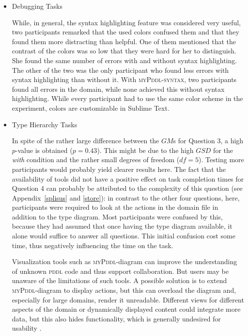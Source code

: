 \documentclass[runningheads]{llncs}
\newcommand{\mypddl}{\textsc{myPddl}\xspace}
\newcommand{\mypddlsyntax}{\textsc{myPddl-syntax}\xspace}
\newcommand{\pddl}{\textsc{pddl}\xspace}
\newcommand{\sublimetext}{Sublime Text\xspace}
\begin{document}
\begin{itemize}
\item Debugging Tasks

  While, in general, the syntax highlighting feature was considered
  very useful, two participants remarked that the used colors confused
  them and that they found them more distracting than helpful. One of
  them mentioned that the contrast of the colors was so low that they
  were hard for her to distinguish. She found the same number of
  errors with and without syntax highlighting. The other of the two
  was the only participant who found less errors with syntax
  highlighting than without it. With \mypddlsyntax, two participants
  found all errors in the domain, while none achieved this without
  syntax highlighting. While every participant had to use the same
  color scheme in the experiment, colors are customizable in
  \sublimetext.

\item Type Hierarchy Tasks

  In spite of the rather large difference between the $GM$s for
  Question 3, a high $p$-value is obtained ($p = 0.43$). This might be
  due to the high $GSD$ for the \emph{with} condition and the rather
  small degrees of freedom ($df = 5$). Testing more participants would
  probably yield clearer results here. The fact that the availability
  of tools did not have a positive effect on task completion times for
  Question 4 can probably be attributed to the complexity of this
  question (see Appendix~\ref{splisus} and \ref{store}): in contrast
  to the other four questions, here, participants were required to
  look at the actions in the domain file in addition to the type
  diagram. Most participants were confused by this, because they had
  assumed that once having the type diagram available, it alone would
  suffice to answer all questions. This initial confusion cost some
  time, thus negatively influencing the time on the task.

  Visualization tools such as \mypddl -diagram can improve the
  understanding of unknown \pddl code and thus support
  collaboration. But users may be unaware of the limitations of such
  tools. A possible solution is to extend \mypddl -diagram to display
  actions, but this can overload the diagram and, especially for large
  domains, render it unreadable. Different views for different aspects
  of the domain or dynamically displayed content could integrate more
  data, but this also hides functionality, which is generally
  undesired for usability \cite{norman2002design}.


\end{itemize}
\end{document}
